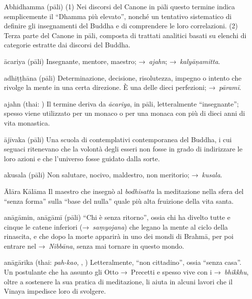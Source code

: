 \begin{glossarydescription}


\item[Abhidhamma] (pāli) (1) Nei discorsi del Canone in pāli questo termine
  indica semplicemente il ``Dhamma più elevato'', nonché un tentativo
  sistematico di definire gli insegnamenti del Buddha e di comprendere le loro
  correlazioni. (2) Terza parte del Canone in pāli, composta di trattati
  analitici basati su elenchi di categorie estratte dai discorsi del Buddha.

\item[ācariya] (pāli) Insegnante, mentore, maestro; →~\emph{ajahn};
  →~\emph{kalyāṇamitta}.

\item[adhiṭṭhāna] (pāli) Determinazione, decisione, risolutezza, impegno o
  intento che rivolge la mente in una certa direzione. È una delle dieci
  perfezioni; →~\emph{pāramī}.

\item[ajahn] (thai: ) Il termine deriva da \emph{ācariya}, in pāli,
  letteralmente ``insegnante''; spesso viene utilizzato per un monaco o per una
  monaca con più di dieci anni di vita monastica.

\item[ājīvaka] (pāli) Una scuola di contemplativi contemporanea del Buddha, i
  cui seguaci ritenevano che la volontà degli esseri non fosse in grado di
  indirizzare le loro azioni e che l'universo fosse guidato dalla sorte.

\item[akusala] (pāli) Non salutare, nocivo, maldestro, non meritorio;
  →~\emph{kusala}.

\item[Ālāra Kālāma] Il maestro che insegnò al \emph{bodhisatta} la meditazione
  nella sfera del ``senza forma'' sulla ``base del nulla'' quale più alta
  fruizione della vita santa.

\item[anāgāmin, anāgāmī] (pāli) ``Chi è senza ritorno'', ossia chi ha divelto
  tutte e cinque le catene inferiori (→~\emph{saṃyojana}) che legano la mente al
  ciclo della rinascita, e che dopo la morte apparirà in uno dei mondi di
  Brahmā, per poi entrare nel →~\emph{Nibbāna}, senza mai tornare in questo
  mondo.

\item[anāgārika] (thai: \emph{pah-kao}, , )
  Letteralmente, ``non cittadino'', ossia ``senza casa''. Un postulante che ha
  assunto gli Otto →~Precetti e spesso vive con i →~\emph{bhikkhu}, oltre a
  sostenere la sua pratica di meditazione, li aiuta in alcuni lavori che il
  Vinaya impedisce loro di svolgere.


\end{glossarydescription}
